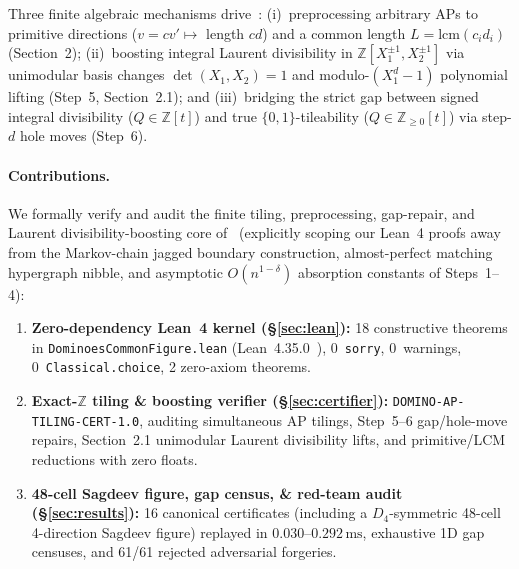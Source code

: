 \documentclass[11pt,twocolumn]{article}
\newcommand{\ZZ}{\mathbb{Z}}
\begin{document}
Three finite algebraic mechanisms drive~\cite{keevash2026dominoes}: (i)~preprocessing arbitrary APs to primitive directions ($v = c v' \mapsto$ length $cd$) and a common length $L = \mathrm{lcm}(c_i d_i)$ (Section~2); (ii)~boosting integral Laurent divisibility in $\ZZ[X_1^{\pm 1}, X_2^{\pm 1}]$ via unimodular basis changes $\det(X_1, X_2) = 1$ and modulo-$(X_1^d - 1)$ polynomial lifting (Step~5, Section~2.1); and (iii)~bridging the strict gap between signed integral divisibility ($Q \in \ZZ[t]$) and true $\{0,1\}$-tileability ($Q \in \ZZ_{\ge 0}[t]$) via step-$d$ hole moves (Step~6).

\paragraph{Contributions.}
We formally verify and audit the finite tiling, preprocessing, gap-repair, and Laurent divisibility-boosting core of~\cite{keevash2026dominoes} (explicitly scoping our Lean~4 proofs away from the Markov-chain jagged boundary construction, almost-perfect matching hypergraph nibble, and asymptotic $O(n^{1-\delta})$ absorption constants of Steps~1--4):
\begin{enumerate}[leftmargin=*,nosep]
  \item \textbf{Zero-dependency Lean~4 kernel (\S\ref{sec:lean}):} 18 constructive theorems in \texttt{DominoesCommonFigure.lean} (Lean~4.35.0~\cite{demoura2021lean4}), 0~\texttt{sorry}, 0~warnings, 0~\texttt{Classical.choice}, 2 zero-axiom theorems.
  \item \textbf{Exact-$\ZZ$ tiling \& boosting verifier (\S\ref{sec:certifier}):} \texttt{DOMINO-AP-TILING-CERT-1.0}, auditing simultaneous AP tilings, Step~5--6 gap/hole-move repairs, Section~2.1 unimodular Laurent divisibility lifts, and primitive/LCM reductions with zero floats.
  \item \textbf{48-cell Sagdeev figure, gap census, \& red-team audit (\S\ref{sec:results}):} 16 canonical certificates (including a $D_4$-symmetric 48-cell 4-direction Sagdeev figure) replayed in $0.030$--$0.292\,\mathrm{ms}$, exhaustive 1D gap censuses, and 61/61 rejected adversarial forgeries.
\end{enumerate}
\end{document}
